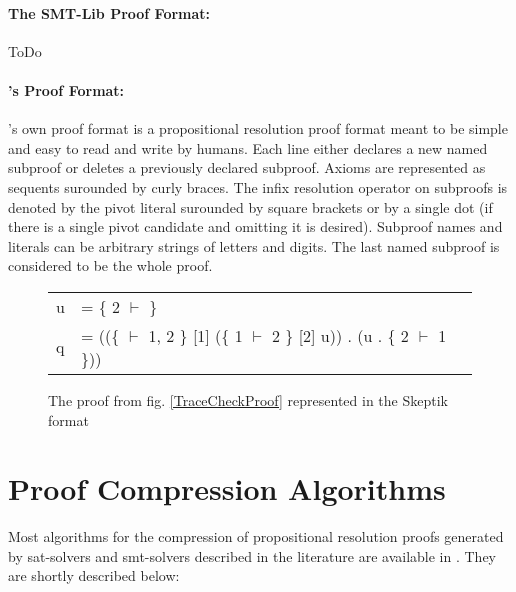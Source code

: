 \documentclass{llncs}
\begin{document}
\paragraph{The SMT-Lib Proof Format: }

{\veriT}

ToDo


\paragraph{{\skeptik}'s Proof Format: }

{\skeptik}'s own proof format is a propositional resolution proof format meant to be simple and easy to read and write by humans. Each line either declares a new named subproof or deletes a previously declared subproof. Axioms are represented as sequents surounded by curly braces. The infix resolution operator on
subproofs is denoted by the pivot literal surounded by square brackets or by a single dot (if there is a single pivot candidate and omitting it is desired). Subproof names and literals can be arbitrary strings of letters and digits. The last named subproof is considered to be the whole proof.

\begin{figure}
  \centering
  \begin{tabular}{ll}
    u &= \{ 2 $\vdash$ \} \\
    q &= ((\{ $\vdash$ 1, 2 \} [1] (\{ 1 $\vdash$ 2 \} [2] u)) . (u . \{ 2 $\vdash$ 1 \}))
  \end{tabular}
  \caption{The proof from fig. \ref{TraceCheckProof} represented in the Skeptik format}
  \label{SkeptikProof}
\end{figure}


\section{Proof Compression Algorithms}

Most algorithms for the compression of propositional resolution proofs generated by sat-solvers and smt-solvers described in the literature are available in {\skeptik}. They are shortly described below:
\end{document}
